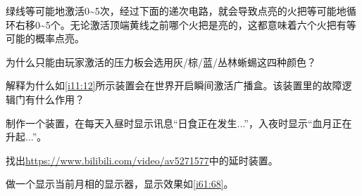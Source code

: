 绿线等可能地激活0\~{}5次，经过下面的递次电路，就会导致点亮的火把等可能地循环右移0\~{}5个。无论激活顶端黄线之前哪个火把是亮的，这都意味着六个火把有等可能的概率点亮。

\begin{problemset}
\item 为什么只能由玩家激活的压力板会选用灰/棕/蓝/丛林蜥蜴这四种颜色？
\item 解释为什么如\autoref{i11:12}所示装置会在世界开启瞬间激活广播盒。该装置里的故障逻辑门有什么作用？
\begin{figure}[h]
\begin{center}
\end{center}
\caption{}
\label{i11:12}
\end{figure}
\item 制作一个装置，在每天入昼时显示讯息“日食正在发生...”，入夜时显示“血月正在升起...”。
\item 找出\url{https://www.bilibili.com/video/av5271577}中的延时装置。
\item 做一个显示当前月相的显示器，显示效果如\autoref{i61:68}。
\begin{figure}[h]
\begin{center}
\end{center}
\end{figure}
\end{problemset}
